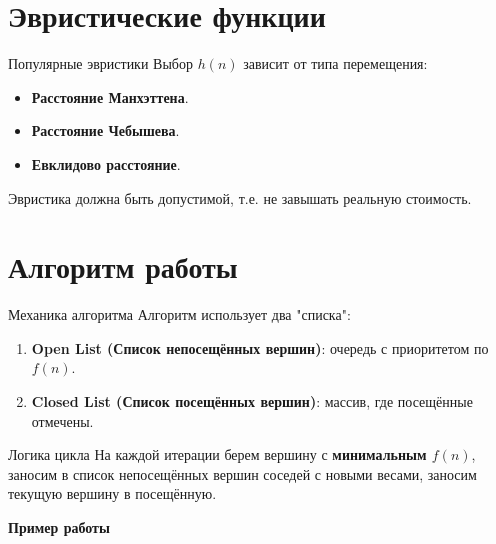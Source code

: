 \documentclass{beamer}
\begin{document}
\section{Эвристические функции}
\begin{frame}{Популярные эвристики}
    Выбор $h(n)$ зависит от типа перемещения:
    \begin{itemize}
        \item \textbf{Расстояние Манхэттена}.
        \item \textbf{Расстояние Чебышева}.
        \item \textbf{Евклидово расстояние}.
    \end{itemize}
    Эвристика должна быть допустимой, т.е. не завышать реальную стоимость.
\end{frame}

\section{Алгоритм работы}
\begin{frame}{Механика алгоритма}
    Алгоритм использует два "списка":
    \begin{enumerate}
        \item \textbf{Open List (Список непосещённых вершин)}: очередь с приоритетом по $f(n)$.
        \item \textbf{Closed List (Список посещённых вершин)}: массив, где посещённые отмечены.
    \end{enumerate}
    
    \begin{exampleblock}{Логика цикла}
        На каждой итерации берем вершину с \textbf{минимальным $f(n)$}, заносим в список непосещённых вершин соседей с новыми весами, заносим текущую вершину в посещённую.
    \end{exampleblock}
\end{frame}

\begin{frame}
	\centering
	\Huge \textbf{Пример работы}
\end{frame}
\end{document}
